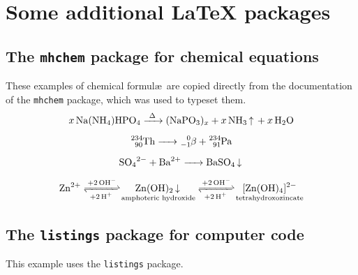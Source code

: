 




\chapter{Some additional \LaTeX{} packages}

\section{The \texttt{mhchem} package for chemical equations}

These examples of chemical formul\ae\ are copied directly from the documentation of the \texttt{mhchem} package, which was used to typeset them.
\begin{gather}
\ce{x Na(NH4)HPO4 ->[\Delta] (NaPO3)_x + x NH3 ^ + x H2O} \\[0.5em]
\ce{^234_90Th -> ^0_-1$\beta${} + ^234_91Pa} \\[0.5em]
\ce{SO4^2- + Ba^2+ -> BaSO4 v} \\[0.5em]
\ce{Zn^2+
<=>[+ 2OH-][+ 2H+]
$\underset{\textrm{amphoteric hydroxide}}{\ce{Zn(OH)2 v}}$
<=>[+ 2OH-][+ 2H+]
$\underset{\textrm{tetrahydroxozincate}}{\ce{[Zn(OH)4]^2-}}$
}
\end{gather}


\section{The \texttt{listings} package for computer code}

This example uses the \texttt{listings} package.

\bigskip

%
%


